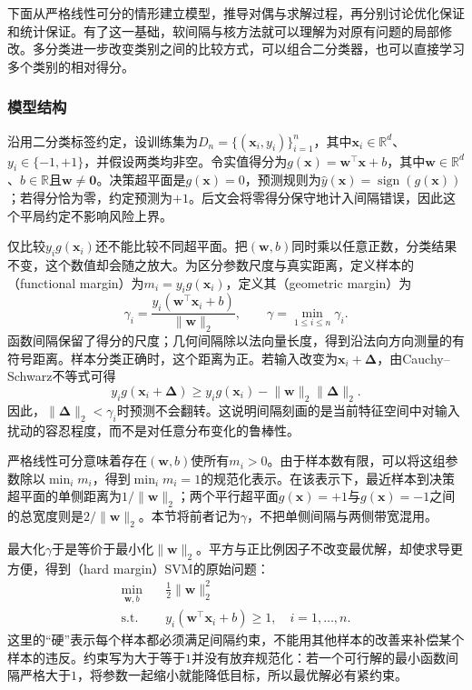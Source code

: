 下面从严格线性可分的情形建立模型，推导对偶与求解过程，再分别讨论优化保证和统计保证。有了这一基础，软间隔与核方法就可以理解为对原有问题的局部修改。多分类进一步改变类别之间的比较方式，可以组合二分类器，也可以直接学习多个类别的相对得分。

\subsubsection{模型结构}
\label{sec:classification-svm-model}

沿用二分类标签约定，设训练集为$D_n=\{(\bm{x}_i,y_i)\}_{i=1}^n$，其中$\bm{x}_i\in\mathbb{R}^d$、$y_i\in\{-1,+1\}$，并假设两类均非空。令实值得分为$g(\bm{x})=\bm{w}^{\top}\bm{x}+b$，其中$\bm{w}\in\mathbb{R}^d$、$b\in\mathbb{R}$且$\bm{w}\ne\bm{0}$。决策超平面是$g(\bm{x})=0$，预测规则为$\hat y(\bm{x})=\operatorname{sign}(g(\bm{x}))$；若得分恰为零，约定预测为$+1$。后文会将零得分保守地计入间隔错误，因此这个平局约定不影响风险上界。

仅比较$y_i g(\bm{x}_i)$还不能比较不同超平面。把$(\bm{w},b)$同时乘以任意正数，分类结果不变，这个数值却会随之放大。为区分参数尺度与真实距离，定义样本的（functional margin）为$m_i=y_i g(\bm{x}_i)$，定义其（geometric margin）为
\begin{equation}
  \gamma_i
  =\frac{y_i(\bm{w}^{\top}\bm{x}_i+b)}
         {\lVert\bm{w}\rVert_2},
  \qquad
  \gamma=\min_{1\le i\le n}\gamma_i.
  \label{eq:classification-svm-margin}
\end{equation}
函数间隔保留了得分的尺度；几何间隔除以法向量长度，得到沿法向方向测量的有符号距离。样本分类正确时，这个距离为正。若输入改变为$\bm{x}_i+\bm{\Delta}$，由Cauchy--Schwarz不等式可得
\[
  y_i g(\bm{x}_i+\bm{\Delta})
  \ge y_i g(\bm{x}_i)
      -\lVert\bm{w}\rVert_2\lVert\bm{\Delta}\rVert_2.
\]
因此，$\lVert\bm{\Delta}\rVert_2<\gamma_i$时预测不会翻转。这说明间隔刻画的是当前特征空间中对输入扰动的容忍程度，而不是对任意分布变化的鲁棒性。

严格线性可分意味着存在$(\bm{w},b)$使所有$m_i>0$。由于样本数有限，可以将这组参数除以$\min_i m_i$，得到$\min_i m_i=1$的规范化表示。在该表示下，最近样本到决策超平面的单侧距离为$1/\lVert\bm{w}\rVert_2$；两个平行超平面$g(\bm{x})=+1$与$g(\bm{x})=-1$之间的总宽度则是$2/\lVert\bm{w}\rVert_2$。本节将前者记为$\gamma$，不把单侧间隔与两侧带宽混用。

最大化$\gamma$于是等价于最小化$\lVert\bm{w}\rVert_2$。平方与正比例因子不改变最优解，却使求导更方便，得到（hard margin）SVM的原始问题：
\begin{equation}
  \begin{aligned}
    \min_{\bm{w},b}\quad&
      \frac12\lVert\bm{w}\rVert_2^2\\
    \text{s.t.}\quad&
      y_i(\bm{w}^{\top}\bm{x}_i+b)\ge1,
      \quad i=1,\ldots,n.
  \end{aligned}
  \label{eq:classification-svm-hard-primal}
\end{equation}
这里的“硬”表示每个样本都必须满足间隔约束，不能用其他样本的改善来补偿某个样本的违反。约束写为大于等于$1$并没有放弃规范化：若一个可行解的最小函数间隔严格大于$1$，将参数一起缩小就能降低目标，所以最优解必有紧约束。

